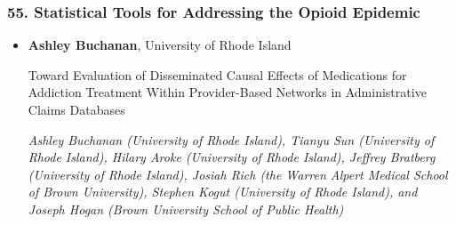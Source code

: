 \subsubsection*{55. Statistical Tools for Addressing the Opioid Epidemic}

\begin{itemize}
\item \textbf{Ashley Buchanan}, University of Rhode Island

Toward Evaluation of Disseminated Causal Effects of Medications for Addiction Treatment Within Provider-Based Networks in Administrative Claims Databases

\emph{\footnotesize Ashley Buchanan (University of Rhode Island), Tianyu Sun (University of Rhode Island), Hilary Aroke (University of Rhode Island), Jeffrey Bratberg (University of Rhode Island), Josiah Rich (the Warren Alpert Medical School of Brown University), Stephen Kogut (University of Rhode Island), and Joseph Hogan (Brown University School of Public Health)}


\end{itemize}
